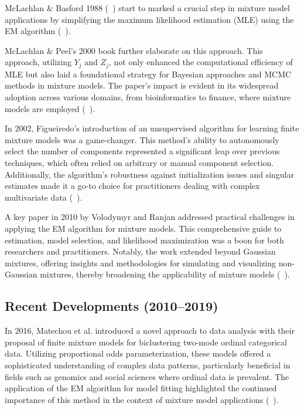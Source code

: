\documentclass{article}
\begin{document}
McLachlan \& Basford 1988 (~\cite{mclachlan1988mixture}) start to marked a crucial step in mixture model applications by simplifying the maximum likelihood estimation (MLE) using the EM algorithm (~\cite{dempster1977maximum}).

McLachlan \& Peel's 2000 book further elaborate on this approach. This approach, utilizing $Y_j$ and $Z_j$, not only enhanced the computational efficiency of MLE but also laid a foundational strategy for Bayesian approaches and MCMC methods in mixture models. The paper’s impact is evident in its widespread adoption across various domains, from bioinformatics to finance, where mixture models are employed (~\cite{mclachlan2000finite}).

In 2002, Figueiredo's introduction of an unsupervised algorithm for learning finite mixture models was a game-changer. This method's ability to autonomously select the number of components represented a significant leap over previous techniques, which often relied on arbitrary or manual component selection. Additionally, the algorithm's robustness against initialization issues and singular estimates made it a go-to choice for practitioners dealing with complex multivariate data (~\cite{figueiredo2002unsupervised}).

A key paper in 2010 by Volodymyr and Ranjan addressed practical challenges in applying the EM algorithm for mixture models. This comprehensive guide to estimation, model selection, and likelihood maximization was a boon for both researchers and practitioners. Notably, the work extended beyond Gaussian mixtures, offering insights and methodologies for simulating and visualizing non-Gaussian mixtures, thereby broadening the applicability of mixture models (~\cite{10.1214/09-SS053}).

\subsection{Recent Developments (2010--2019)}

In 2016, Matechou et al. introduced a novel approach to data analysis with their proposal of finite mixture models for biclustering two-mode ordinal categorical data. Utilizing proportional odds parameterization, these models offered a sophisticated understanding of complex data patterns, particularly beneficial in fields such as genomics and social sciences where ordinal data is prevalent. The application of the EM algorithm for model fitting highlighted the continued importance of this method in the context of mixture model applications (~\cite{matechou2016biclustering}).
\end{document}
